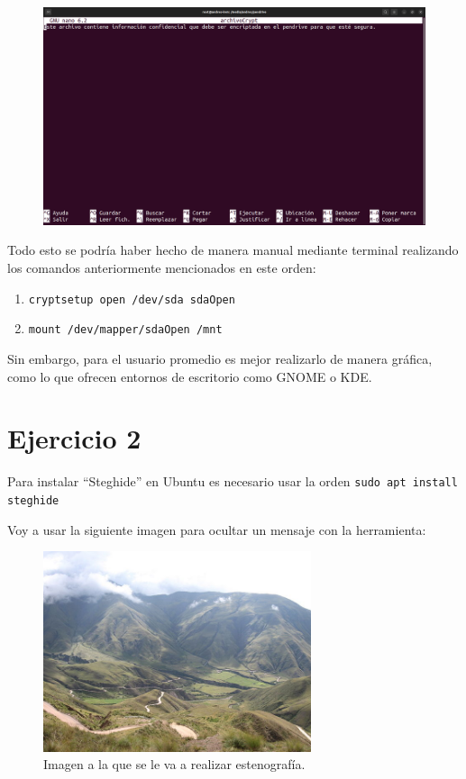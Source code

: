 \documentclass{article}
\begin{document}
\begin{figure}[H]
    \includegraphics[width=\textwidth]{imagenes/Captura desde 2022-10-30 11-05-44.png}
\end{figure}

\bigskip

Todo esto se podría haber hecho de manera manual mediante terminal realizando los comandos anteriormente mencionados en este orden:

\begin{enumerate}
    \item \verb|cryptsetup open /dev/sda sdaOpen|
    \item \verb|mount /dev/mapper/sdaOpen /mnt|
\end{enumerate}

Sin embargo, para el usuario promedio es mejor realizarlo de manera gráfica, como lo que ofrecen entornos de escritorio como GNOME o KDE.

\section*{Ejercicio 2}

Para instalar ``Steghide'' en Ubuntu es necesario usar la orden \verb|sudo apt install steghide|

\bigskip

Voy a usar la siguiente imagen para ocultar un mensaje con la herramienta:

\begin{figure}[H]
    \centering
    \includegraphics[width=0.7\textwidth]{imagenes/imagen.jpg}
    \caption{Imagen a la que se le va a realizar estenografía.}
\end{figure}
\end{document}
